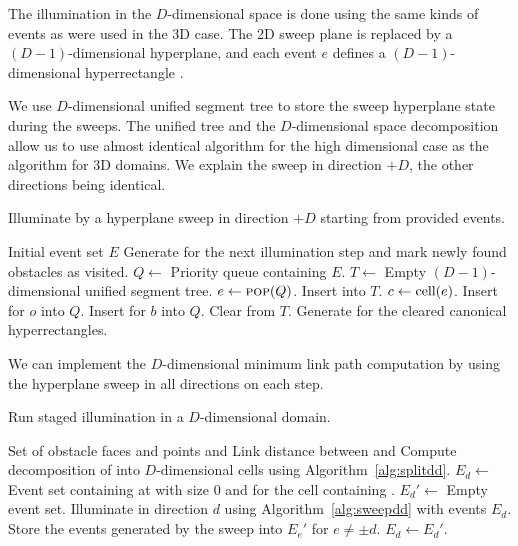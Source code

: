 \documentclass[english,gradu]{tktltiki2018}
\begin{document}
The illumination in the $D$-dimensional space is done using the same kinds of events as were used in the 3D case.
The 2D sweep plane is replaced by a $(D-1)$-dimensional hyperplane, and each event $e$ defines a $(D-1)$-dimensional hyperrectangle .

We use $D$-dimensional unified segment tree to store the sweep hyperplane state during the sweeps.
The unified tree and the $D$-dimensional space decomposition allow us to use almost identical algorithm for the high dimensional case as the algorithm for 3D domains.
We explain the sweep in direction $+D$, the other directions being identical.

\begin{algorithm}
\caption{Illuminate by a hyperplane sweep in direction $+D$ starting from provided events.}
\label{alg:sweepdd}
\begin{algorithmic}
\Require Initial event set $E$
\Ensure Generate \addEs for the next illumination step and mark newly found obstacles as visited.
\State $Q\gets$ Priority queue containing $E$.
\State $T\gets$ Empty $(D-1)$-dimensional unified segment tree.
	\State $e\gets\textsc{pop}(Q)$.
		\State Insert  into $T$.
			\State $c\gets\text{cell}(e)$.
				\State Insert \obsE for $o$ into $Q$.
			\EndFor
				\State Insert \cellE for $b$ into $Q$.
			\EndFor
		\EndIf
		\State Clear  from $T$.
		\State Generate \addEs for the cleared canonical hyperrectangles.
	\EndIf
\EndWhile
\end{algorithmic}
\end{algorithm}

We can implement the $D$-dimensional minimum link path computation by using the hyperplane sweep in all directions on each step.

\begin{algorithm}
\caption{Run staged illumination in a $D$-dimensional domain.}
\label{alg:minlinkdd}
\begin{algorithmic}
\Require Set of obstacle faces and points \spt and \ept
\Ensure Link distance between \spt and \ept
\State Compute decomposition of \fspace into $D$-dimensional cells using Algorithm~\ref{alg:splitdd}.
	\State $E_d\gets$ Event set containing \addE at \spt with size 0 and \cellE for the cell containing \spt.
\EndFor
{}
		\State $E_d'\gets$ Empty event set.
	\EndFor
		\State Illuminate in direction $d$ using Algorithm~\ref{alg:sweepdd} with events $E_d$.
		\State Store the events generated by the sweep into $E_e'$ for $e\neq\pm d$.
	\EndFor
		\State $E_d\gets E_d'$.
	\EndFor
\EndWhile
\end{algorithmic}
\end{algorithm}
\end{document}
